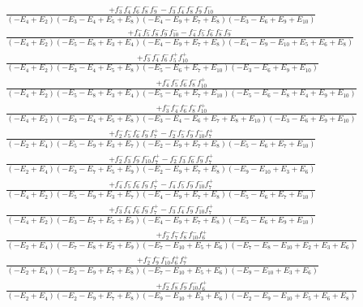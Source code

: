 \documentclass{article}
\begin{document}
\[\begin{array}{rcl}
\frac{+f_{3}^{-}f_{4}^{-}f_{6}^{-}f_{8}^{-}f_{9}^{-}-f_{3}^{-}f_{4}^{-}f_{8}^{-}f_{9}^{-}f_{10}^{-}}{(-E_{4}+E_{2})(-E_{3}-E_{4}+E_{5}+E_{8})(-E_{4}-E_{9}+E_{7}+E_{8})(-E_{3}-E_{6}+E_{9}+E_{10})}\\
\frac{+f_{4}^{-}f_{5}^{-}f_{8}^{-}f_{9}^{-}f_{10}^{-}-f_{4}^{-}f_{5}^{-}f_{6}^{-}f_{8}^{-}f_{9}^{-}}{(-E_{4}+E_{2})(-E_{5}-E_{8}+E_{3}+E_{4})(-E_{4}-E_{9}+E_{7}+E_{8})(-E_{4}-E_{9}-E_{10}+E_{5}+E_{6}+E_{8})}\\
\frac{+f_{3}^{-}f_{4}^{-}f_{6}^{-}f_{5}^{+}f_{10}^{+}}{(-E_{4}+E_{2})(-E_{3}-E_{4}+E_{5}+E_{8})(-E_{5}-E_{6}+E_{7}+E_{10})(-E_{3}-E_{6}+E_{9}+E_{10})}\\
\frac{+f_{4}^{-}f_{5}^{-}f_{6}^{-}f_{8}^{-}f_{10}^{+}}{(-E_{4}+E_{2})(-E_{5}-E_{8}+E_{3}+E_{4})(-E_{5}-E_{6}+E_{7}+E_{10})(-E_{5}-E_{6}-E_{8}+E_{4}+E_{9}+E_{10})}\\
\frac{+f_{3}^{-}f_{4}^{-}f_{6}^{-}f_{8}^{-}f_{10}^{+}}{(-E_{4}+E_{2})(-E_{3}-E_{4}+E_{5}+E_{8})(-E_{3}-E_{4}-E_{6}+E_{7}+E_{8}+E_{10})(-E_{3}-E_{6}+E_{9}+E_{10})}\\
\frac{+f_{2}^{-}f_{5}^{-}f_{6}^{-}f_{9}^{-}f_{7}^{+}-f_{2}^{-}f_{5}^{-}f_{9}^{-}f_{10}^{-}f_{7}^{+}}{(-E_{2}+E_{4})(-E_{5}-E_{9}+E_{3}+E_{7})(-E_{2}-E_{9}+E_{7}+E_{8})(-E_{5}-E_{6}+E_{7}+E_{10})}\\
\frac{+f_{2}^{-}f_{3}^{-}f_{9}^{-}f_{10}^{-}f_{7}^{+}-f_{2}^{-}f_{3}^{-}f_{6}^{-}f_{9}^{-}f_{7}^{+}}{(-E_{2}+E_{4})(-E_{3}-E_{7}+E_{5}+E_{9})(-E_{2}-E_{9}+E_{7}+E_{8})(-E_{9}-E_{10}+E_{3}+E_{6})}\\
\frac{+f_{4}^{-}f_{5}^{-}f_{6}^{-}f_{9}^{-}f_{7}^{+}-f_{4}^{-}f_{5}^{-}f_{9}^{-}f_{10}^{-}f_{7}^{+}}{(-E_{4}+E_{2})(-E_{5}-E_{9}+E_{3}+E_{7})(-E_{4}-E_{9}+E_{7}+E_{8})(-E_{5}-E_{6}+E_{7}+E_{10})}\\
\frac{+f_{3}^{-}f_{4}^{-}f_{6}^{-}f_{9}^{-}f_{7}^{+}-f_{3}^{-}f_{4}^{-}f_{9}^{-}f_{10}^{-}f_{7}^{+}}{(-E_{4}+E_{2})(-E_{3}-E_{7}+E_{5}+E_{9})(-E_{4}-E_{9}+E_{7}+E_{8})(-E_{3}-E_{6}+E_{9}+E_{10})}\\
\frac{+f_{2}^{-}f_{7}^{-}f_{8}^{-}f_{10}^{-}f_{6}^{+}}{(-E_{2}+E_{4})(-E_{7}-E_{8}+E_{2}+E_{9})(-E_{7}-E_{10}+E_{5}+E_{6})(-E_{7}-E_{8}-E_{10}+E_{2}+E_{3}+E_{6})}\\
\frac{+f_{2}^{-}f_{9}^{-}f_{10}^{-}f_{6}^{+}f_{7}^{+}}{(-E_{2}+E_{4})(-E_{2}-E_{9}+E_{7}+E_{8})(-E_{7}-E_{10}+E_{5}+E_{6})(-E_{9}-E_{10}+E_{3}+E_{6})}\\
\frac{+f_{2}^{-}f_{8}^{-}f_{9}^{-}f_{10}^{-}f_{6}^{+}}{(-E_{2}+E_{4})(-E_{2}-E_{9}+E_{7}+E_{8})(-E_{9}-E_{10}+E_{3}+E_{6})(-E_{2}-E_{9}-E_{10}+E_{5}+E_{6}+E_{8})}\\

\end{array}\]
\end{document}

